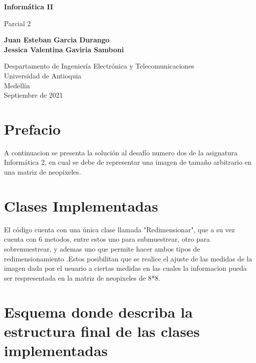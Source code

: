 \documentclass{article}
\begin{document}
\begin{titlepage}
    \begin{center}
        \vspace*{1cm}
            
        \Huge
        \textbf{Informática II}
            
        \vspace{0.5cm}
        \LARGE
        Parcial 2
            
        \vspace{1.5cm}
            
        \textbf{Juan Esteban Garcia Durango\\
            Jessica Valentina Gaviria Samboni }
        \vfill
            
        \vspace{0.8cm}
            
        \Large
        Despartamento de Ingeniería Electrónica y Telecomunicaciones\\
        Universidad de Antioquia\\
        Medellín\\
        Septiembre de 2021
            
    \end{center}
\end{titlepage}

\tableofcontents
\newpage
\section{Prefacio}\label{intro}
A continuacion se presenta la solución al desafío numero dos de la asignatura Informática 2, en cual se debe de representar una imagen de tamaño arbitrario en una matriz de neopixeles.\\

\section{Clases Implementadas} \label{Descripción}
 El código cuenta con una única clase llamada "Redimensionar", que a su vez cuenta con 6 metodos, entre estos uno para submuestrear, otro para sobremuestrear, y ademas uno que permite hacer ambos tipos de redimensionamiento .Estos posibilitan que se realice el ajuste de las medidas de la imagen dada por el usuario a ciertas medidas en las cuales la informacion pueda ser respresentada en la matriz de neopixeles de 8*8.

\section{Esquema donde describa la estructura final de las clases implementadas} \label{esquema}
\end{document}
